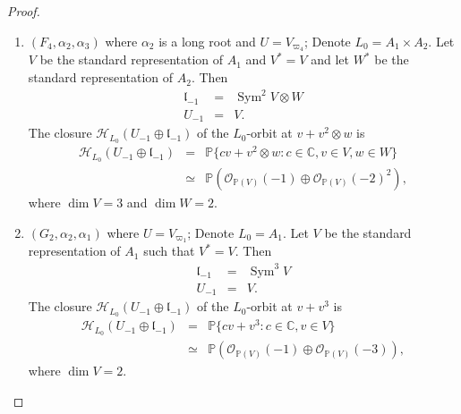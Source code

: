 \documentclass[12pt]{amsart}
\theoremstyle{plain}
\theoremstyle{definition}
\def\Sym{\operatorname{Sym}}
\begin{document}
\begin{proof}
\begin{enumerate}
\item[(4)] $(F_{4}, \alpha_{2}, \alpha_{3})$ where $\alpha_{2}$ is a long root and $U=V_{\varpi_4}$; Denote $L_0=A_{1}\times A_2$. Let $V$ be the standard representation of $A_{1}$ and $V^*=V$ and let $W^*$ be the standard representation of $A_{2}$. Then
\begin{eqnarray*}
\mathfrak l_{-1}&=& \Sym^2V\otimes W \\
U_{-1}&=&V.
\end{eqnarray*}
The closure   $\mathcal H_{L_0}( U_{-1}\oplus \mathfrak l_{-1})$ of the $L_0$-orbit at $v+ v^2\otimes w$ is%
\begin{eqnarray*}
\mathcal H_{L_0}( U_{-1}\oplus \mathfrak l_{-1})&=& \mathbb P \{c v + v^2 \otimes w: c \in \mathbb C, v \in V, w \in W\} \\
&\simeq& \mathbb P (\mathcal O_{\mathbb P(V)}(-1) \oplus \mathcal O_{\mathbb P(V)}(-2)^{2}),
\end{eqnarray*}
where $\dim V=3$ and $ \dim W= 2$.

\item[(5)] $(G_{2}, \alpha_{2}, \alpha_{1})$ where $U=V_{\varpi_1}$; Denote $L_0=A_{1}$. Let $V$ be the standard representation of $A_{1}$ such that $V^*=V$. Then
\begin{eqnarray*}
\mathfrak l_{-1}&=& \Sym^3V \\
U_{-1}&=& V.
\end{eqnarray*}
The closure $\mathcal H_{L_0}( U_{-1}\oplus \mathfrak l_{-1})$ of the  $L_0$-orbit at $v+ v^3$ is  %
\begin{eqnarray*}
\mathcal H_{L_0}( U_{-1}\oplus \mathfrak l_{-1})&=& \mathbb P \{c v + v^3 : c \in \mathbb C, v \in V\} \\
&\simeq& \mathbb P (\mathcal O_{\mathbb P(V)}(-1) \oplus \mathcal O_{\mathbb P(V)}(-3)),
\end{eqnarray*}
where $\dim V=2$.
\end{enumerate}


\end{proof}
\end{document}
